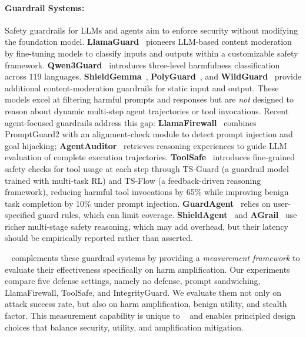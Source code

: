 \paragraph{Guardrail Systems:}
Safety guardrails for LLMs and agents aim to enforce security without modifying the foundation model. \textbf{LlamaGuard}~\cite{inan2023llama} pioneers LLM-based content moderation by fine-tuning models to classify inputs and outputs within a customizable safety framework. \textbf{Qwen3Guard}~\cite{zhao2025qwen3guard} introduces three-level harmfulness classification across 119 languages. \textbf{ShieldGemma}~\cite{zeng2024shieldgemma}, \textbf{PolyGuard}~\cite{kumar2025polyguard}, and \textbf{WildGuard}~\cite{han2024wildguard} provide additional content-moderation guardrails for static input and output. These models excel at filtering harmful prompts and responses but are \textit{not} designed to reason about dynamic multi-step agent trajectories or tool invocations. Recent agent-focused guardrails address this gap: \textbf{LlamaFirewall}~\cite{chennabasappa2025llamafirewall} combines PromptGuard2 with an alignment-check module to detect prompt injection and goal hijacking; \textbf{AgentAuditor}~\cite{luo2026agentauditor} retrieves reasoning experiences to guide LLM evaluation of complete execution trajectories. \textbf{ToolSafe}~\cite{mou2026toolsafe} introduces fine-grained safety checks for tool usage at each step through TS-Guard (a guardrail model trained with multi-task RL) and TS-Flow (a feedback-driven reasoning framework), reducing harmful tool invocations by 65\% while improving benign task completion by 10\% under prompt injection. \textbf{GuardAgent}~\cite{xiang2025guardagent} relies on user-specified guard rules, which can limit coverage. \textbf{ShieldAgent}~\cite{chen2025shieldagent} and \textbf{AGrail}~\cite{luo2025agrail} use richer multi-stage safety reasoning, which may add overhead, but their latency should be empirically reported rather than asserted.

\proposed~ complements these guardrail systems by providing a \textit{measurement framework} to evaluate their effectiveness specifically on harm amplification. Our experiments compare five defense settings, namely no defense, prompt sandwiching, LlamaFirewall, ToolSafe, and IntegrityGuard. We evaluate them not only on attack success rate, but also on harm amplification, benign utility, and stealth factor. This measurement capability is unique to \proposed~ and enables principled design choices that balance security, utility, and amplification mitigation.

